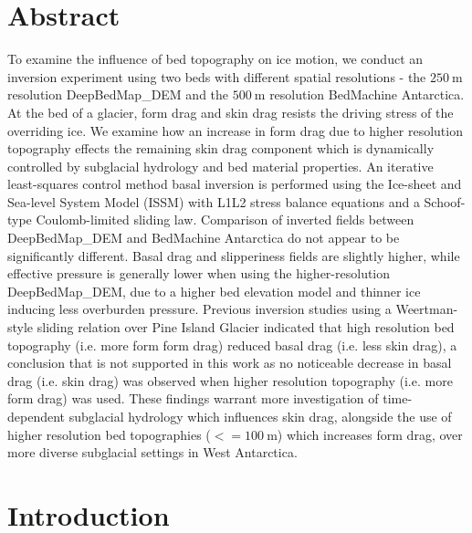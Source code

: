 
\section*{Abstract}

To examine the influence of bed topography on ice motion, we conduct an inversion experiment using two beds with different spatial resolutions - the $\SI{250}{\metre}$ resolution DeepBedMap\_DEM and the $\SI{500}{\metre}$ resolution BedMachine Antarctica.
At the bed of a glacier, form drag and skin drag resists the driving stress of the overriding ice.
We examine how an increase in form drag due to higher resolution topography effects the remaining skin drag component which is dynamically controlled by subglacial hydrology and bed material properties.
An iterative least-squares control method basal inversion is performed using the Ice-sheet and Sea-level System Model (ISSM) with L1L2 stress balance equations and a Schoof-type Coulomb-limited sliding law.
Comparison of inverted fields between DeepBedMap\_DEM and BedMachine Antarctica do not appear to be significantly different.
Basal drag and slipperiness fields are slightly higher, while effective pressure is generally lower when using the higher-resolution DeepBedMap\_DEM, due to a higher bed elevation model and thinner ice inducing less overburden pressure.
Previous inversion studies using a Weertman-style sliding relation over Pine Island Glacier indicated that high resolution bed topography (i.e. more form form drag) reduced basal drag (i.e. less skin drag), a conclusion that is not supported in this work as no noticeable decrease in basal drag (i.e. skin drag) was observed when higher resolution topography (i.e. more form drag) was used.
These findings warrant more investigation of time-dependent subglacial hydrology which influences skin drag, alongside the use of higher resolution bed topographies ($<= \SI{100}{\metre}$) which increases form drag, over more diverse subglacial settings in West Antarctica.


\section{Introduction}


